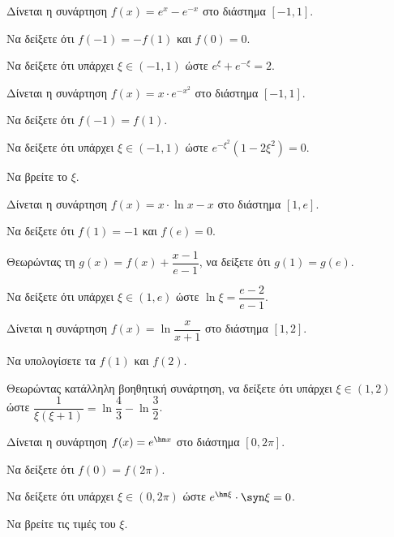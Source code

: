 \documentclass[11pt,a4paper,modern]{FFExercises}
\begin{document}
\askhsh
Δίνεται η συνάρτηση $f(x) = e^x - e^{-x}$ στο διάστημα $[-1, 1]$.
\begin{alist}
  \item Να δείξετε ότι $f(-1) = -f(1)$ και $f(0) = 0$.
  \item Να δείξετε ότι υπάρχει $\xi \in (-1, 1)$ ώστε $e^\xi + e^{-\xi} = 2$.
\end{alist}

\askhsh
Δίνεται η συνάρτηση $f(x) = x \cdot e^{-x^2}$ στο διάστημα $[-1, 1]$.
\begin{alist}
  \item Να δείξετε ότι $f(-1) = f(1)$.
  \item Να δείξετε ότι υπάρχει $\xi \in (-1, 1)$ ώστε $e^{-\xi^2}(1 - 2\xi^2) = 0$.
  \item Να βρείτε το $\xi$.
\end{alist}


\askhsh
Δίνεται η συνάρτηση $f(x) = x \cdot \ln x - x$ στο διάστημα $[1, e]$.
\begin{alist}
  \item Να δείξετε ότι $f(1) = -1$ και $f(e) = 0$.
  \item Θεωρώντας τη $g(x) = f(x) + \dfrac{x-1}{e-1}$, να δείξετε ότι $g(1) = g(e)$.
  \item Να δείξετε ότι υπάρχει $\xi \in (1, e)$ ώστε $\ln\xi = \dfrac{e-2}{e-1}$.
\end{alist}

\askhsh
Δίνεται η συνάρτηση $f(x) = \ln\dfrac{x}{x+1}$ στο διάστημα $[1, 2]$.
\begin{alist}
  \item Να υπολογίσετε τα $f(1)$ και $f(2)$.
  \item Θεωρώντας κατάλληλη βοηθητική συνάρτηση, να δείξετε ότι υπάρχει $\xi \in (1, 2)$ ώστε $\dfrac{1}{\xi(\xi+1)} = \ln\dfrac{4}{3} - \ln\dfrac{3}{2}$.
\end{alist}


\askhsh
Δίνεται η συνάρτηση $f(x) = e^{\hm x}$ στο διάστημα $[0, 2\pi]$.
\begin{alist}
  \item Να δείξετε ότι $f(0) = f(2\pi)$.
  \item Να δείξετε ότι υπάρχει $\xi \in (0, 2\pi)$ ώστε $e^{\hm\xi} \cdot \syn\xi = 0$.
  \item Να βρείτε τις τιμές του $\xi$.
\end{alist}
\end{document}
